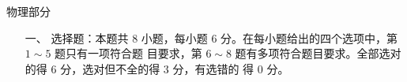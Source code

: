 
\begin{center}
\heiti 
{}
物理部分
\end{center}
\vspace{2em}

\begin{enumerate}
\heiti
\renewcommand{\labelenumi}{\arabic{enumi}.}
\item[一、]
选择题：本题共 $ 8 $ 小题，每小题 $ 6 $ 分。在每小题给出的四个选项中，第 $ 1 \sim 5 $ 题只有一项符合题
目要求，第 $ 6 \sim 8 $ 题有多项符合题目要求。全部选对的得 $ 6 $ 分，选对但不全的得 $ 3 $ 分，有选错的
得 $ 0 $ 分。




\end{enumerate}


